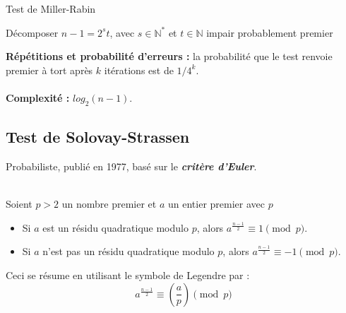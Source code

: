 			\begin{frame}
			
				\begin{algorithm}[H]
				\caption{Test de Miller-Rabin}\label{TMR}
				{Décomposer $n - 1 = 2^{s}t$, avec $s \in \mathbb{N}^{*}$ et $t \in \mathbb{N}$ impair \;}
				\Retour probablement premier\;
				\end{algorithm}
		
			\end{frame}
			
			\begin{frame}
				\textbf{Répétitions et probabilité d'erreurs :} la probabilité que le test renvoie premier à tort après $k$ itérations est de $1/4^{k}$.\\~\\
		
				\textbf{Complexité :} $log_{2}(n - 1)$.
			\end{frame}
		
		\subsection{Test de Solovay-Strassen}	
			\begin{frame}
			Probabiliste, publié en 1977, basé sur le \textit{\textbf{critère d'Euler}}.\\~\\
			\begin{Th}
			\label{CritereEuler}
			Soient $p > 2$ un nombre premier et $a$ un entier premier avec $p$
			\begin{itemize}
				\item Si $a$ est un résidu quadratique modulo $p$, alors $a^{\frac{n-1}{2}} \equiv 1 \pmod p$.
				\item Si $a$ n'est pas un résidu quadratique modulo $p$, alors $a^{\frac{n-1}{2}} \equiv -1 \pmod p$.
			\end{itemize}
			Ceci se résume en utilisant le symbole de Legendre par :
			\[a^{\frac{n-1}{2}} \equiv \left ( \frac{a}{p} \right ) \pmod p\]
			\end{Th}
		
			\end{frame}
			
